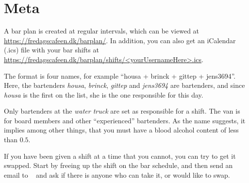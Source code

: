 \section{Meta}
\label{sec:meta}

A bar plan is created at regular intervals, which can be viewed at
\url{https://fredagscafeen.dk/barplan/}. In addition, you can also get an
iCalendar (.ics) file with your bar shifts at
\url{https://fredagscafeen.dk/barplan/shifts/<yourUsernameHere>.ics}.

The format is four names, for example ``housa + brinck +
gittep + jens3694''. Here, the bartenders \emph{housa},
\emph{brinck}, \emph{gittep} and \emph{jens3694} are bartenders, and
since \emph{housa} is the first on the list, she is the one responsible for
this day.

Only bartenders at the \emph{water truck} are set as
responsible for a shift. The van is for board members
and other ``experienced'' bartenders. As the name suggests, it implies
among other things, that you must have a blood alcohol content of less than $0.5$.

If you have been given a shift at a time that you cannot, you can try
to get it swapped. Start by freeing up the shift on the bar schedule,
and then send an email to \allemail~ and
ask if there is anyone who can take it, or would like to swap.

